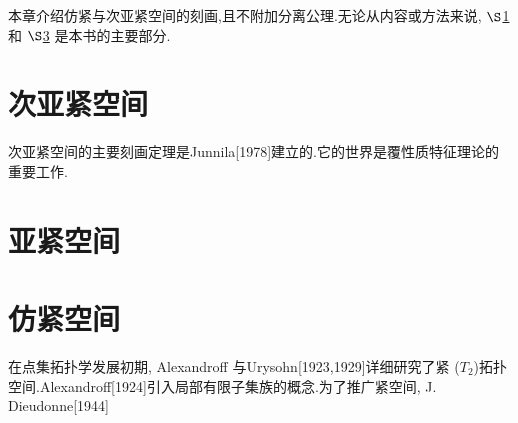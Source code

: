 \documentclass[main.tex]{subfiles}
\begin{document}
本章介绍仿紧与次亚紧空间的刻画,且不附加分离公理.无论从内容或方法来说, $\S$\ref{ch2.1} 和 $\S$\ref{ch2.3} 是本书的主要部分.

\section{次亚紧空间}\label{ch2.1}
次亚紧空间的主要刻画定理是Junnila[1978]建立的.它的世界是覆性质特征理论的重要工作.



\section{亚紧空间}\label{ch2.2}




\section{仿紧空间}\label{ch2.3}
在点集拓扑学发展初期, Alexandroff 与Urysohn[1923,1929]详细研究了紧
($T_2$)拓扑空间.Alexandroff[1924]引入局部有限子集族的概念.为了推广紧空间, J. Dieudonne[1944]
	
\end{document}
